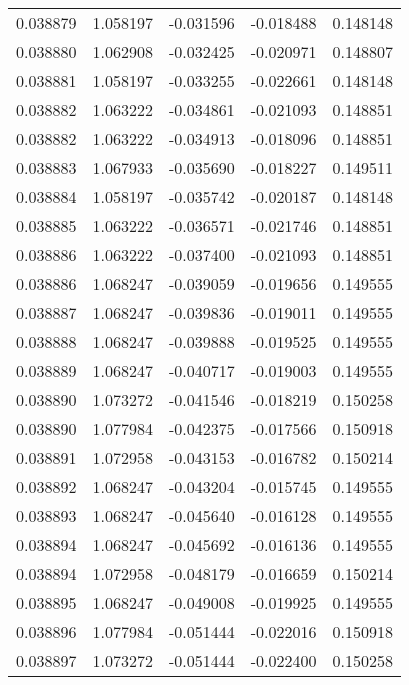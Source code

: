 \begin{tabular}{lrrrr}
0.038879    &  1.058197 & -0.031596 & -0.018488 &             0.148148 \\
0.038880    &  1.062908 & -0.032425 & -0.020971 &             0.148807 \\
0.038881    &  1.058197 & -0.033255 & -0.022661 &             0.148148 \\
0.038882    &  1.063222 & -0.034861 & -0.021093 &             0.148851 \\
0.038882    &  1.063222 & -0.034913 & -0.018096 &             0.148851 \\
0.038883    &  1.067933 & -0.035690 & -0.018227 &             0.149511 \\
0.038884    &  1.058197 & -0.035742 & -0.020187 &             0.148148 \\
0.038885    &  1.063222 & -0.036571 & -0.021746 &             0.148851 \\
0.038886    &  1.063222 & -0.037400 & -0.021093 &             0.148851 \\
0.038886    &  1.068247 & -0.039059 & -0.019656 &             0.149555 \\
0.038887    &  1.068247 & -0.039836 & -0.019011 &             0.149555 \\
0.038888    &  1.068247 & -0.039888 & -0.019525 &             0.149555 \\
0.038889    &  1.068247 & -0.040717 & -0.019003 &             0.149555 \\
0.038890    &  1.073272 & -0.041546 & -0.018219 &             0.150258 \\
0.038890    &  1.077984 & -0.042375 & -0.017566 &             0.150918 \\
0.038891    &  1.072958 & -0.043153 & -0.016782 &             0.150214 \\
0.038892    &  1.068247 & -0.043204 & -0.015745 &             0.149555 \\
0.038893    &  1.068247 & -0.045640 & -0.016128 &             0.149555 \\
0.038894    &  1.068247 & -0.045692 & -0.016136 &             0.149555 \\
0.038894    &  1.072958 & -0.048179 & -0.016659 &             0.150214 \\
0.038895    &  1.068247 & -0.049008 & -0.019925 &             0.149555 \\
0.038896    &  1.077984 & -0.051444 & -0.022016 &             0.150918 \\
0.038897    &  1.073272 & -0.051444 & -0.022400 &             0.150258 \\

\end{tabular}
